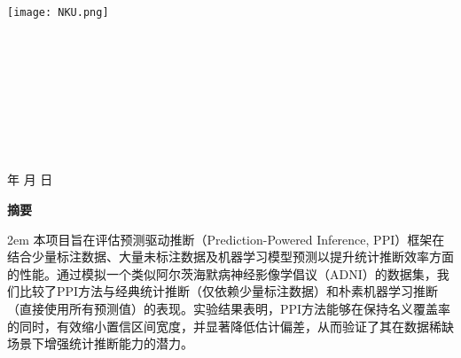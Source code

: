 \documentclass[12pt,a4paper]{article}
\begin{document}
\renewcommand{\contentsname}{目录}
\renewcommand{\appendixname}{附录}
\renewcommand{\appendixpagename}{附录}
\renewcommand{\refname}{参考文献} 
\renewcommand{\figurename}{图}
\renewcommand{\tablename}{表}
\renewcommand{\abstractname}{摘要}
\renewcommand{\today}{\number\year 年 \number\month 月 \number\day 日}

\renewcommand {\thefigure}{\thesection{}.\arabic{figure}}%
\renewcommand{\figurename}{图}
\renewcommand{\contentsname}{目录}  

\begin{titlepage}
    \begin{center}
    \texttt{[image: NKU.png]}\\[1cm]
    \vspace{20mm}
		\textbf{\huge\textbf{}}\\[0.5cm]
		\textbf{\huge{}}\\[2.3cm]

		\vspace{\fill}
    
    \centering
    \textsc{\LARGE {}}\\[0.5cm]
    \textsc{\LARGE {}}\\[0.5cm]
    \textsc{\LARGE {}}\\[0.5cm]
    \textsc{\LARGE {}}\\[0.5cm]
    \textsc{\LARGE {}}\\[0.5cm]
    \textsc{\LARGE {}}\\[0.5cm]
    \vfill
    {\Large \today}
    \end{center}
\end{titlepage}

\clearpage
{} %
\begin{center}
    {\songti\bfseries 摘\quad 要}
\end{center}
\vspace{0.5em}
\parindent 2em %
\small
本项目旨在评估预测驱动推断（Prediction-Powered Inference, PPI）框架在结合少量标注数据、大量未标注数据及机器学习模型预测以提升统计推断效率方面的性能。通过模拟一个类似阿尔茨海默病神经影像学倡议（ADNI）的数据集，我们比较了PPI方法与经典统计推断（仅依赖少量标注数据）和朴素机器学习推断（直接使用所有预测值）的表现。实验结果表明，PPI方法能够在保持名义覆盖率的同时，有效缩小置信区间宽度，并显著降低估计偏差，从而验证了其在数据稀缺场景下增强统计推断能力的潜力。
\end{document}
